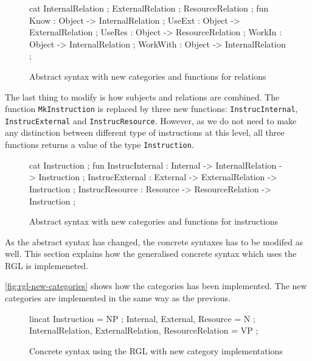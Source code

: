 \begin{figure}[H]
\begin{code}
cat
  InternalRelation ;
  ExternalRelation ;
  ResourceRelation ;
fun
  Know     : Object -> InternalRelation ;
  UseExt   : Object -> ExternalRelation ;
  UseRes   : Object -> ResourceRelation ;
  WorkIn   : Object -> InternalRelation ;
  WorkWith : Object -> InternalRelation ;
\end{code}
\caption{Abstract syntax with new categories and functions for relations \label{fig:newrelations}}
\end{figure}

The last thing to modify is how subjects and relations are combined. The function \texttt{MkInstruction} is replaced by three new functions: \texttt{InstrucInternal}, \texttt{InstrucExternal} and \texttt{InstrucResource}. However, as we do not need to make any distinction between different type of instructions at this level, all three functions returns a value of the type \texttt{Instruction}.

\begin{figure}[H]
\begin{code}
cat
  Instruction ;
fun
  InstrucInternal : Internal -> InternalRelation -> Instruction ;
  InstrucExternal : External -> ExternalRelation -> Instruction ;
  InstrucResource : Resource -> ResourceRelation -> Instruction ;
\end{code}
\caption{Abstract syntax with new categories and functions for instructions\label{fig:newinstructions}}
\end{figure}

As the abstract syntax has changed, the concrete syntaxes has to be modifed as well. This section explains how the generalised concrete syntax which uses the RGL is implemeneted. 

\autoref{fig:rgl-new-categories} shows how the categories has been implemented. The new categories are implemented in the same way as the previous.

\begin{figure}[H]
\begin{code}
lincat
  Instruction = NP ;
  Internal, External, Resource = N ;
  InternalRelation, ExternalRelation, ResourceRelation = VP ;
\end{code}
\caption{Concrete syntax using the RGL with new category implementations\label{fig:rgl-new-categories}}
\end{figure}

